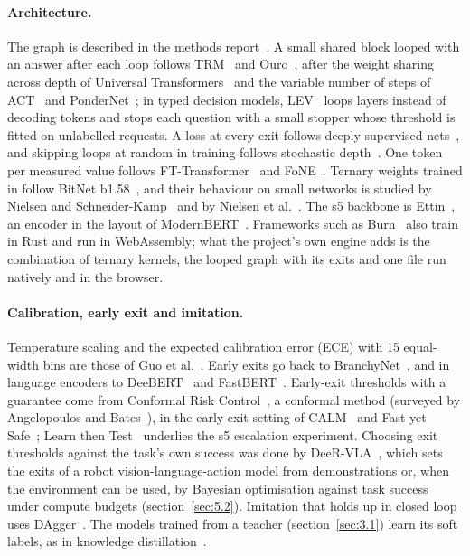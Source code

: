 \documentclass[10pt]{article}
\begin{document}
\paragraph{Architecture.} The graph is described in the methods report~\cite{golfier2026methods}. A small shared block looped with an answer after each loop follows TRM~\cite{jolicoeur2025trm} and Ouro~\cite{zhu2025ouro}, after the weight sharing across depth of Universal Transformers~\cite{dehghani2019ut} and the variable number of steps of ACT~\cite{graves2016act} and PonderNet~\cite{banino2021pondernet}; in typed decision models, LEV~\cite{song2026lev} loops layers instead of decoding tokens and stops each question with a small stopper whose threshold is fitted on unlabelled requests. A loss at every exit follows deeply-supervised nets~\cite{lee2014dsn}, and skipping loops at random in training follows stochastic depth~\cite{huang2016stochastic}. One token per measured value follows FT-Transformer~\cite{gorishniy2021ftt} and FoNE~\cite{zhou2025fone}. Ternary weights trained in follow BitNet b1.58~\cite{ma2024bitnet}, and their behaviour on small networks is studied by Nielsen and Schneider-Kamp~\cite{nielsen2024reloaded} and by Nielsen et al.~\cite{nielsen2024bits}. The s5 backbone is Ettin~\cite{weller2025ettin}, an encoder in the layout of ModernBERT~\cite{warner2024modernbert}. Frameworks such as Burn~\cite{burn} also train in Rust and run in WebAssembly; what the project's own engine adds is the combination of ternary kernels, the looped graph with its exits and one file run natively and in the browser.

\paragraph{Calibration, early exit and imitation.} Temperature scaling and the expected calibration error (ECE) with 15 equal-width bins are those of Guo et al.~\cite{guo2017calibration}. Early exits go back to BranchyNet~\cite{teerapittayanon2017branchynet}, and in language encoders to DeeBERT~\cite{xin2020deebert} and FastBERT~\cite{liu2020fastbert}. Early-exit thresholds with a guarantee come from Conformal Risk Control~\cite{angelopoulos2022crc}, a conformal method (surveyed by Angelopoulos and Bates~\cite{angelopoulos2021gentle}), in the early-exit setting of CALM~\cite{schuster2022calm} and Fast yet Safe~\cite{jazbec2024fastyetsafe}; Learn then Test~\cite{angelopoulos2021ltt} underlies the s5 escalation experiment. Choosing exit thresholds against the task's own success was done by DeeR-VLA~\cite{yue2024deer}, which sets the exits of a robot vision-language-action model from demonstrations or, when the environment can be used, by Bayesian optimisation against task success under compute budgets (section~\ref{sec:5.2}). Imitation that holds up in closed loop uses DAgger~\cite{ross2011dagger}. The models trained from a teacher (section~\ref{sec:3.1}) learn its soft labels, as in knowledge distillation~\cite{hinton2015distilling}.
\end{document}
